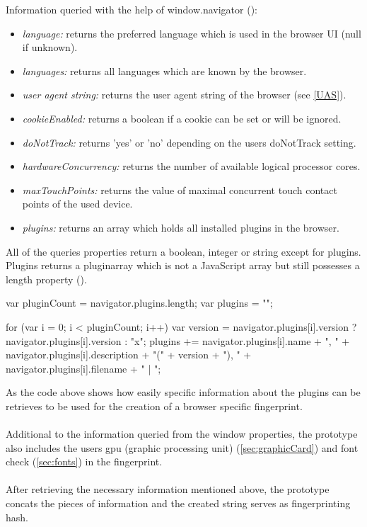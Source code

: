 Information queried with the help of window.navigator (\textcite{nav19}):
\begin{itemize}
	\item \textit{language: }returns the preferred language which is used in the browser UI (null if unknown).
	\item \textit{languages: }returns all languages which are known by the browser.
	\item \textit{user agent string: }returns the user agent string of the browser (see \autoref{UAS}).
	\item \textit{cookieEnabled: }returns a boolean if a cookie can be set or will be ignored.
	\item \textit{doNotTrack: }returns 'yes' or 'no' depending on the users doNotTrack setting.
	\item \textit{hardwareConcurrency: }returns the number of available logical processor cores.
	\item \textit{maxTouchPoints: }returns the value of maximal concurrent touch contact points of the used device.
	\item \textit{plugins: }returns an array which holds all installed plugins in the browser.\\
\end{itemize}
All of the queries properties return a boolean, integer or string except for plugins. Plugins returns a pluginarray which is not a JavaScript array but still possesses a length property (\textcite{nav19}).\\
\begin{JsCode}
	var pluginCount = navigator.plugins.length;
	var plugins = "";
	
	for (var i = 0; i < pluginCount; i++) {
		var version = navigator.plugins[i].version ? navigator.plugins[i].version
		: "x";
		plugins += navigator.plugins[i].name + ", "
		+ navigator.plugins[i].description + "(" + version
		+ "), " + navigator.plugins[i].filename + " | ";
	}
\end{JsCode}
As the code above shows how easily specific information about the plugins can be retrieves to be used for the creation of a browser specific fingerprint.\\\\
Additional to the information queried from the window properties, the prototype also includes the users gpu (graphic processing unit) (\autoref{sec:graphicCard}) and font check (\autoref{sec:fonts}) in the fingerprint.\\\\
After retrieving the necessary information mentioned above, the prototype concats the pieces of information and the created string serves as fingerprinting hash.

